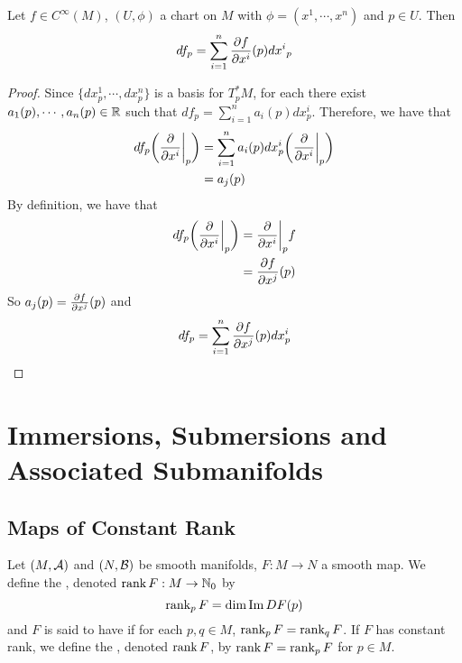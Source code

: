 \documentclass{book}
\begin{document}
	\begin{ex}
		Let $f \in C^{\infty}(M)$, $(U, \phi)$ a chart on $M$ with $\phi = (x^1, \cdots, x^n)$ and $p \in U$. Then $$df_p = \sum_{i=1}^n \frac{\partial f}{\partial x^i}(p) {dx^i}_p$$
	\end{ex}

	\begin{proof}
		 Since $\{dx^1_p, \cdots, dx^n_p\}$ is a basis for $T^*_pM$, for each there exist $a_1(p), \cdots, a_n(p) \in \mathbb{R}$ such that $df_p = \sum\limits_{i=1}^n a_i(p)dx^i_p$. Therefore, we have that 
		\begin{align*}
			df_p \bigg(\frac{\partial}{\partial x^i} \bigg|_p \bigg) 
			&= \sum\limits_{i=1}^n a_i(p)dx^i_p \bigg(\frac{\partial}{\partial x^i} \bigg|_p \bigg)  \\
			&=  a_j(p)
		\end{align*}
		By definition, we have that 
		\begin{align*}
			df_p\bigg(\frac{\partial}{\partial x^i} \bigg|_p \bigg) 
			&= \frac{\partial}{\partial x^i} \bigg|_p f \\ 
			&= \frac{\partial f}{\partial x^j}(p)\\
		\end{align*}
		So $a_j(p) = \frac{\partial f}{\partial x^j} (p)$ and $$df_p = \sum\limits_{i=1}^n \frac{\partial f}{\partial x^j} (p)dx^i_p$$
	\end{proof}
		
	
	
	
	
	
	
	
	
	
	
	
	
	
	
	
	
	
	
	\newpage
	\chapter{Immersions, Submersions and Associated Submanifolds}
	
	\section{Maps of Constant Rank}
	
	
	\begin{defn} 
		Let $(M, \mathcal{A})$ and $(N, \mathcal{B})$ be smooth manifolds, $F: M \rightarrow N$ a smooth map. We define the , denoted $\operatorname{\text{rank}} F: M \rightarrow \mathbb{N}_0$ by 
		$$\operatorname{\text{rank}}_p F = \dim \text{Im} \, D F(p)$$
		and $F$ is said to have   if for each $p, q \in M$, $\operatorname{\text{rank}}_p F = \operatorname{\text{rank}}_q F$. If $F$ has constant rank, we define the , denoted $\operatorname{\text{rank}} F$, by $\operatorname{\text{rank}} F = \operatorname{\text{rank}}_p F$ for $p \in M$.
	\end{defn}
\end{document}
